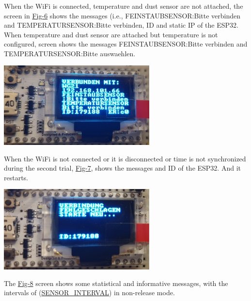 \begin{DoxyItemize}
\begin{DoxyEnumerate}
\item When the Wi\+Fi is connected, temperature and dust sensor are not attached, the screen in \mbox{\hyperlink{index_Fig-6}{Fig-\/6}} shows the messages (i.\+e., F\+E\+I\+N\+S\+T\+A\+U\+B\+S\+E\+N\+S\+OR\+:Bitte verbinden and T\+E\+M\+P\+E\+R\+A\+T\+U\+R\+S\+E\+N\+S\+OR\+:Bitte verbinden, ID and static IP of the E\+S\+P32. When temperature and dust sensor are attached but temperature is not configured, screen shows the messages F\+E\+I\+N\+S\+T\+A\+U\+B\+S\+E\+N\+S\+OR\+:Bitte verbinden and T\+E\+M\+P\+E\+R\+A\+T\+U\+R\+S\+E\+N\+S\+OR\+:Bitte auswaehlen. \label{index_Fig-6}%
%
  
\begin{DoxyImage}
\includegraphics[width=300px]{screen1error}
\end{DoxyImage}

\item When the Wi\+Fi is not connected or it is disconnected or time is not synchronized during the second trial, \mbox{\hyperlink{index_Fig-7}{Fig-\/7}}, shows the messages and ID of the E\+S\+P32. And it restarts. \label{index_Fig-7}%
%
  
\begin{DoxyImage}
\includegraphics[width=300px]{reboot}
\end{DoxyImage}

\item The \mbox{\hyperlink{index_Fig-8}{Fig-\/8}} screen shows some statistical and informative messages, with the intervals of (\mbox{\hyperlink{main_8h_a71a7a65f7dd7e8f3ea14942213cd8217}{S\+E\+N\+S\+O\+R\+\_\+\+I\+N\+T\+E\+R\+V\+AL}}) in non-\/release mode. \label{index_Fig-8}%
%
  

\end{DoxyEnumerate}
\end{DoxyItemize}

